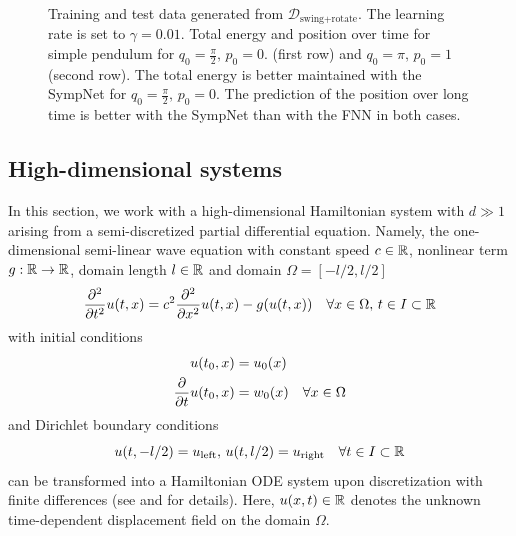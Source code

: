 \documentclass[twoside,a4paper]{article}
\begin{document}
\begin{figure}
	\caption{
	Training and test data generated from $\mathcal{D}_{\text{swing+rotate}}$.
	The learning rate is set to $\gamma = 0.01$.
	Total energy and position over time for simple pendulum for $q_0 = \frac{\pi}{2},\, p_0 = 0$.
	(first row) and $q_0 = \pi,\, p_0=1$ (second row).
	The total energy is better maintained with the SympNet for $q_0 = \frac{\pi}{2},\, p_0 = 0$.
	The prediction of the position over long time is better with the SympNet than with the FNN
	in both cases.}
\end{figure}

\FloatBarrier
\subsection{High-dimensional systems}

In this section, we work with a high-dimensional Hamiltonian system with $d \gg 1$
arising from a semi-discretized partial differential equation.
Namely,
the one-dimensional semi-linear wave equation with constant speed $c \in \mathbb{R}$, nonlinear term 
$g : \mathbb{R} \to \mathbb{R}$, domain length $l \in \mathbb{R}$ and domain $\Omega = [-l/2, l/2]$
\begin{equation*}
	\frac{\partial^2}{\partial t^2} u(t,x) = 
	c^2 \frac{\partial^2}{\partial x^2} u(t,x) - g(u(t,x)) 
	\quad \forall x \in \Omega, 
	\, t \in I \subset \mathbb{R}
\end{equation*}
with initial conditions
\begin{align*}
	u(t_0,x) &= u_0(x) \\
	\frac{\partial }{\partial t} u(t_0,x) &= w_0(x) \quad \forall x \in \Omega
\end{align*}
and Dirichlet boundary conditions
\begin{equation*}
	u(t,-l/2) = u_{\text{left}}, \, u(t,l/2) = u_{\text{right}} \quad \forall t \in I \subset \mathbb{R}
\end{equation*}
can be transformed into a Hamiltonian ODE system upon discretization with finite differences
(see \cite{2006ham_pde} and \cite{peng2016} for details). 
Here, $u(x,t) \in \mathbb{R}$ denotes the unknown time-dependent displacement field on the domain $\Omega$.
\end{document}
